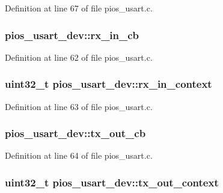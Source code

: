 \-Definition at line 67 of file pios\-\_\-usart.\-c.

\hypertarget{structpios__usart__dev_a604c1d7dbae9c36025b38ac556734cad}{
\subsubsection[{rx\-\_\-in\-\_\-cb}]{ {\bf pios\-\_\-usart\-\_\-dev\-::rx\-\_\-in\-\_\-cb}}}\label{structpios__usart__dev_a604c1d7dbae9c36025b38ac556734cad}


\-Definition at line 62 of file pios\-\_\-usart.\-c.

\hypertarget{structpios__usart__dev_ab2a4099b0c4ff51081a4aaf5997979e5}{
\subsubsection[{rx\-\_\-in\-\_\-context}]{\setlength{\rightskip}{0pt plus 5cm}uint32\-\_\-t {\bf pios\-\_\-usart\-\_\-dev\-::rx\-\_\-in\-\_\-context}}}\label{structpios__usart__dev_ab2a4099b0c4ff51081a4aaf5997979e5}


\-Definition at line 63 of file pios\-\_\-usart.\-c.

\hypertarget{structpios__usart__dev_a492ccd307ef7d05febd54d4747028125}{
\subsubsection[{tx\-\_\-out\-\_\-cb}]{ {\bf pios\-\_\-usart\-\_\-dev\-::tx\-\_\-out\-\_\-cb}}}\label{structpios__usart__dev_a492ccd307ef7d05febd54d4747028125}


\-Definition at line 64 of file pios\-\_\-usart.\-c.

\hypertarget{structpios__usart__dev_af77f59770d9584ab03c1393ee5e937fa}{
\subsubsection[{tx\-\_\-out\-\_\-context}]{\setlength{\rightskip}{0pt plus 5cm}uint32\-\_\-t {\bf pios\-\_\-usart\-\_\-dev\-::tx\-\_\-out\-\_\-context}}}\label{structpios__usart__dev_af77f59770d9584ab03c1393ee5e937fa}


